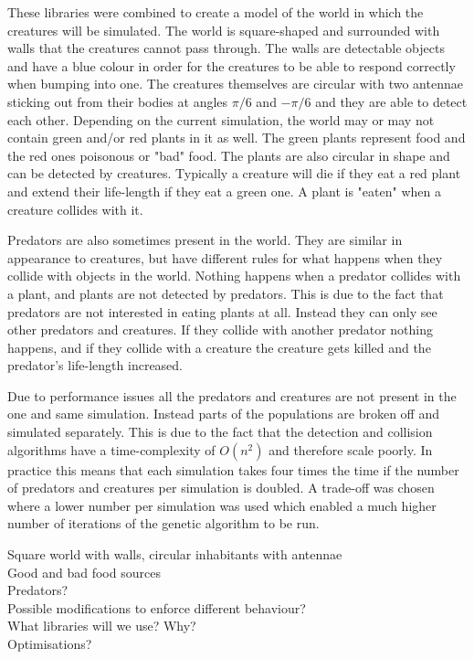 \documentclass[a4paper,11pt]{kth-mag}
\begin{document}
These libraries were combined to create a model of the world in which the creatures will be simulated. The world is square-shaped and surrounded with walls that the creatures cannot pass through. The walls are detectable objects and have a blue colour in order for the creatures to be able to respond correctly when bumping into one. The creatures themselves are circular with two antennae sticking out from their bodies at angles $\pi /6$ and $-\pi/6$ and they are able to detect each other. Depending on the current simulation, the world may or may not contain green and/or red plants in it as well. The green plants represent food and the red ones poisonous or "bad" food. The plants are also circular in shape and can be detected by creatures. Typically a creature will die if they eat a red plant and extend their life-length if they eat a green one. A plant is "eaten" when a creature collides with it.

Predators are also sometimes present in the world. They are similar in appearance to creatures, but have different rules for what happens when they collide with objects in the world. Nothing happens when a predator collides with a plant, and plants are not detected by predators. This is due to the fact that predators are not interested in eating plants at all. Instead they can only see other predators and creatures. If they collide with another predator nothing happens, and if they collide with a creature the creature gets killed and the predator's life-length increased.

Due to performance issues all the predators and creatures are not present in the one and same simulation. Instead parts of the populations are broken off and simulated separately. This is due to the fact that the detection and collision algorithms have a time-complexity of $O({n}^{2})$ and therefore scale poorly. In practice this means that each simulation takes four times the time if the number of predators and creatures per simulation is doubled. A trade-off was chosen where a lower number per simulation was used which enabled a much higher number of iterations of the genetic algorithm to be run.


Square world with walls, circular inhabitants with antennae\\
Good and bad food sources\\
Predators?\\
Possible modifications to enforce different behaviour?\\
What libraries will we use? Why?\\
Optimisations?\\
\end{document}
